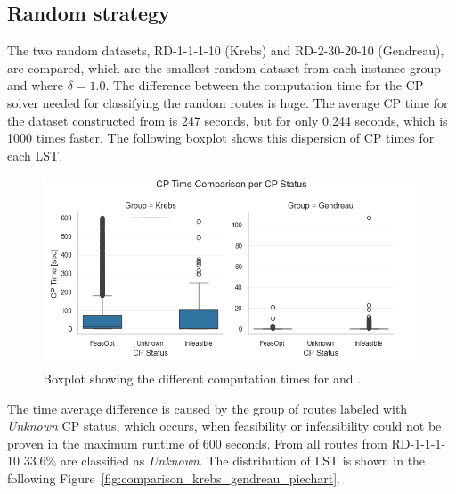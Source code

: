 \subsection{Random strategy}
\label{subsec:challenges_krebs_random}

The two random datasets, RD-1-1-1-10 (Krebs) and RD-2-30-20-10 (Gendreau), are compared, which are the smallest random dataset from each instance group and
where $\delta = 1.0$. The difference between the computation time for the \gls{CP} solver needed for classifying the random routes is huge. The average
\gls{CP} time for the dataset constructed from \krebsADataSetText is 247 seconds, but for \gendreauDataSetText only 0.244 seconds,
which is 1000 times faster. The following boxplot shows this dispersion of \gls{CP} times for each \gls{LST}.
\begin{figure}[ht]
    \centering
    \includegraphics[width=\textwidth]{pictures/comparison_krebs_gendreau/boxplot_cp_time.png}
    \caption{Boxplot showing the different computation times for \krebsADataSetText and \gendreauDataSet.}
    \label{fig:comparison_krebs_gendreau_boxplot}
\end{figure}

The time average difference is caused by the group of routes labeled with \textit{Unknown} \gls{CP} status, which occurs, when
feasibility or infeasibility could not be proven in the maximum runtime of 600 seconds. From all routes from RD-1-1-1-10
33.6\% are classified as \textit{Unknown}. The distribution of \gls{LST} is shown in the following Figure~\ref{fig:comparison_krebs_gendreau_piechart}.

